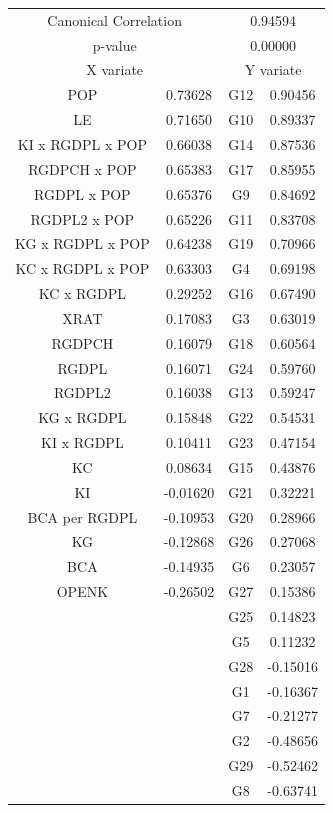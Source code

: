 \begin{figure}[H]
  \begin{subfigure}{.65\textwidth}
  \centering
  \begin{tabular}{ c c | c c }
    \multicolumn{2}{c}{Canonical Correlation} &  \multicolumn{2}{c}{0.94594} \\
    \multicolumn{2}{c}{p-value} &  \multicolumn{2}{c}{0.00000} \\
    \hline
    \multicolumn{2}{c}{X variate} & \multicolumn{2}{c}{Y variate}\\
    \hline
  POP & 0.73628 &  \cellcolor{col2} G12 & 0.90456\\
  LE & 0.71650 &  \cellcolor{col1} G10 & 0.89337\\
  KI x RGDPL x POP & 0.66038 &  \cellcolor{col2}G14 & 0.87536\\
  RGDPCH x POP & 0.65383 &  \cellcolor{col3}G17 & 0.85955\\
  RGDPL x POP & 0.65376 &  \cellcolor{col1}G9 & 0.84692\\
  RGDPL2 x POP & 0.65226 &  \cellcolor{col1}G11 & 0.83708\\
  KG x RGDPL x POP & 0.64238 &  \cellcolor{col3}G19 & 0.70966\\
  KC x RGDPL x POP & 0.63303 &  \cellcolor{col1}G4 & 0.69198\\
  KC x RGDPL & 0.29252 &  \cellcolor{col2}G16 & 0.67490\\
  XRAT & 0.17083 &  \cellcolor{col1}G3 & 0.63019\\
  RGDPCH & 0.16079 &  \cellcolor{col3}G18 & 0.60564\\
  RGDPL & 0.16071 &  \cellcolor{col4}G24 & 0.59760\\
  RGDPL2 & 0.16038 &  \cellcolor{col2}G13 & 0.59247\\
  KG x RGDPL & 0.15848 &  \cellcolor{col4}G22 & 0.54531\\
  KI x RGDPL & 0.10411 &  \cellcolor{col4}G23 & 0.47154\\
  KC & 0.08634 &  \cellcolor{col2}G15 & 0.43876\\
  KI & -0.01620 &  \cellcolor{col3}G21 & 0.32221\\
  BCA per RGDPL & -0.10953 &  \cellcolor{col3}G20 & 0.28966\\
  KG & -0.12868 &  \cellcolor{col5}G26 & 0.27068\\
  BCA & -0.14935 &  \cellcolor{col3}G6 & 0.23057\\
  OPENK & -0.26502 &  \cellcolor{col5}G27 & 0.15386\\
  & &  \cellcolor{col4}G25 & 0.14823\\
  & &  \cellcolor{col3}G5 & 0.11232\\
  & &  \cellcolor{col6}G28 & -0.15016\\
  & &  \cellcolor{col5}G1 & -0.16367\\
  & &  \cellcolor{col6}G7 & -0.21277\\
  & &  \cellcolor{col7}G2 & -0.48656\\
  & &  \cellcolor{col7}G29 & -0.52462\\
  & &  \cellcolor{col7}G8 & -0.63741\\
  \end{tabular}


\end{subfigure}
\end{figure}
